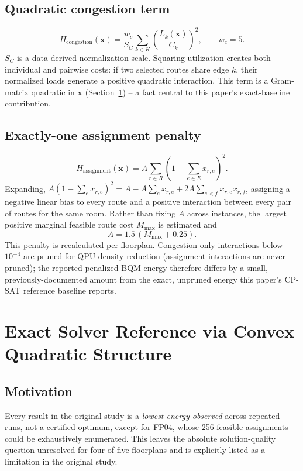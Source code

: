 \documentclass[11pt]{article}
\begin{document}
\subsection{Quadratic congestion term}
\begin{equation}
H_{\text{congestion}}(\mathbf{x}) = \frac{w_c}{S_C}\sum_{k \in K}\left(\frac{L_k(\mathbf{x})}{C_k}\right)^2, \qquad w_c = 5. \tag{5}
\end{equation}
$S_C$ is a data-derived normalization scale. Squaring utilization creates both individual and pairwise costs: if two selected routes share edge $k$, their normalized loads generate a positive quadratic interaction. This term is a Gram-matrix quadratic in $\mathbf{x}$ (Section~\ref{sec:milp}) -- a fact central to this paper's exact-baseline contribution.

\subsection{Exactly-one assignment penalty}
\begin{equation}
H_{\text{assignment}}(\mathbf{x}) = A \sum_{r \in R}\left(1 - \sum_{e \in E} x_{r,e}\right)^2. \tag{6}
\end{equation}
Expanding, $A(1-\sum_e x_{r,e})^2 = A - A\sum_e x_{r,e} + 2A\sum_{e<f} x_{r,e}x_{r,f}$, assigning a negative linear bias to every route and a positive interaction between every pair of routes for the same room. Rather than fixing $A$ across instances, the largest positive marginal feasible route cost $M_{\max}$ is estimated and
\begin{equation}
A = 1.5\,(M_{\max} + 0.25). \tag{7}
\end{equation}
This penalty is recalculated per floorplan. Congestion-only interactions below $10^{-4}$ are pruned for QPU density reduction (assignment interactions are never pruned); the reported penalized-BQM energy therefore differs by a small, previously-documented amount from the exact, unpruned energy this paper's CP-SAT reference baseline reports.

\section{Exact Solver Reference via Convex Quadratic Structure}
\label{sec:milp}

\subsection{Motivation}
Every result in the original study is a \emph{lowest energy observed} across repeated runs, not a certified optimum, except for FP04, whose 256 feasible assignments could be exhaustively enumerated. This leaves the absolute solution-quality question unresolved for four of five floorplans and is explicitly listed as a limitation in the original study.
\end{document}
